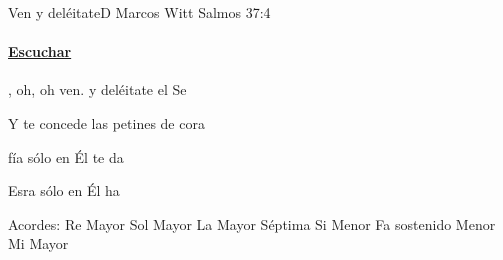 \documentclass[12pt, spanish]{book}
\newcommand{\NotCCLIed}{\relax}
\begin{document}
    \begin{song}{Ven y deléitate}{D}
        {} %
        {Marcos Witt}
        {Salmos 37:4} %
        {} %
        \ifChordBk
        \paragraph{\mbox{}\hfill\protect\href{https://open.spotify.com/intl-es/track/5xj5no7AwtNMeBRY5bsVY9}{Escuchar}\mbox{}\hfill}
        \fi


        \begin{SBOpGroup}
            , oh, oh ven.  y deléitate  el Se


            Y  te concede las petines de  cora
        \end{SBOpGroup}

        \begin{SBChorus}
            fía sólo en   Él te da

            Esra sólo en   Él ha
        \end{SBChorus}

        \ifChordBk
        \begin{SBOpGroup}
            Acordes:\break
            \upchord{\D}\qquad Re Mayor \hfill
            \upchord{\G}\qquad Sol Mayor \hfill\null\break
            \upchord{\Aseven}\qquad La Mayor S\'eptima \hfill
            \upchord{\Bm}\qquad Si Menor \hfill\null\break
            \upchord{\Fsm}Fa sostenido Menor \hfill
            \upchord{\E}\qquad Mi Mayor \hfill\null\break
        \end{SBOpGroup}
        \fi
    \end{song}
\end{document}
